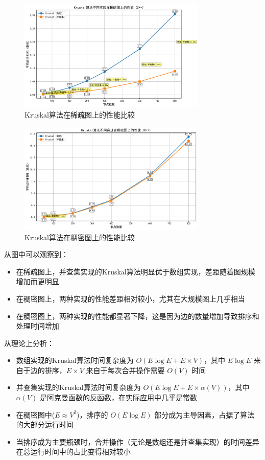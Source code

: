 \documentclass[a4paper,12pt]{ctexart}
\begin{document}
\begin{figure}[htbp]
    \centering
    \includegraphics[width=0.8\textwidth]{img/img_cpp2/kruskal_sparse_comparison_cpp.png}
    \caption{Kruskal算法在稀疏图上的性能比较}
    \label{fig:kruskal_sparse}
\end{figure}

\begin{figure}[htbp]
    \centering
    \includegraphics[width=0.8\textwidth]{img/img_cpp2/kruskal_dense_comparison_cpp.png}
    \caption{Kruskal算法在稠密图上的性能比较}
    \label{fig:kruskal_dense}
\end{figure}

从图中可以观察到：
\begin{itemize}
    \item 在稀疏图上，并查集实现的Kruskal算法明显优于数组实现，差距随着图规模增加而更明显
    \item 在稠密图上，两种实现的性能差距相对较小，尤其在大规模图上几乎相当
    \item 在稠密图上，两种实现的性能都显著下降，这是因为边的数量增加导致排序和处理时间增加
\end{itemize}

从理论上分析：
\begin{itemize}
    \item 数组实现的Kruskal算法时间复杂度为 $O(E \log E + E \times V)$，其中 $E \log E$ 来自于边的排序，$E \times V$ 来自于每次合并操作需要 $O(V)$ 时间
    \item 并查集实现的Kruskal算法时间复杂度为 $O(E \log E + E \times \alpha(V))$，其中 $\alpha(V)$ 是阿克曼函数的反函数，在实际应用中几乎是常数
    \item 在稠密图中($E \approx V^2$)，排序的 $O(E \log E)$ 部分成为主导因素，占据了算法的大部分运行时间
    \item 当排序成为主要瓶颈时，合并操作（无论是数组还是并查集实现）的时间差异在总运行时间中的占比变得相对较小
\end{itemize}
\end{document}
